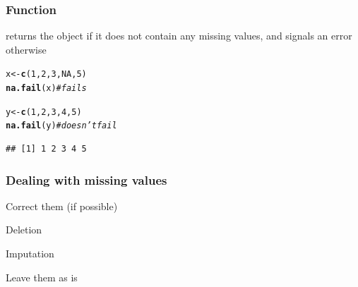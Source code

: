 \documentclass[12pt]{beamer}\usepackage[]{graphicx}\usepackage[]{color}
\makeatletter
\newcommand{\hlnum}[1]{\textcolor[rgb]{0.686,0.059,0.569}{#1}}%
\newcommand{\hlcom}[1]{\textcolor[rgb]{0.678,0.584,0.686}{\textit{#1}}}%
\newcommand{\hlstd}[1]{\textcolor[rgb]{0.345,0.345,0.345}{#1}}%
\newcommand{\hlkwb}[1]{\textcolor[rgb]{0.69,0.353,0.396}{#1}}%
\newcommand{\hlkwd}[1]{\textcolor[rgb]{0.737,0.353,0.396}{\textbf{#1}}}%
\newenvironment{kframe}{%
 \def\at@end@of@kframe{}%
 \ifinner\ifhmode%
  \def\at@end@of@kframe{\end{minipage}}%
  \begin{minipage}{\columnwidth}%
 \fi\fi%
 \def\FrameCommand##1{\hskip\@totalleftmargin \hskip-\fboxsep
 \colorbox{shadecolor}{##1}\hskip-\fboxsep
     \hskip-\linewidth \hskip-\@totalleftmargin \hskip\columnwidth}%
 \MakeFramed {\advance\hsize-\width
   \@totalleftmargin\z@ \linewidth\hsize
   \@setminipage}}%
 {\par\unskip\endMakeFramed%
 \at@end@of@kframe}
\newenvironment{knitrout}{}{} %
\makeatother
\begin{document}

\begin{frame}[fragile]
\frametitle{Function }

{\hilit {}} returns the object if it does not contain any missing values, and signals an error otherwise
\begin{knitrout}\footnotesize
{}\color{fgcolor}\begin{kframe}
\begin{alltt}
\hlstd{x} \hlkwb{<-} \hlkwd{c}\hlstd{(}\hlnum{1}\hlstd{,} \hlnum{2}\hlstd{,} \hlnum{3}\hlstd{,} \hlnum{NA}\hlstd{,} \hlnum{5}\hlstd{)}
\hlkwd{na.fail}\hlstd{(x)}  \hlcom{# fails}
\end{alltt}


{\ttfamily\noindent\bfseries\color{errorcolor}{\#\# Error in na.fail.default(x): missing values in object}}\begin{alltt}
\hlstd{y} \hlkwb{<-} \hlkwd{c}\hlstd{(}\hlnum{1}\hlstd{,} \hlnum{2}\hlstd{,} \hlnum{3}\hlstd{,} \hlnum{4}\hlstd{,} \hlnum{5}\hlstd{)}
\hlkwd{na.fail}\hlstd{(y)}  \hlcom{# doesn't fail}
\end{alltt}
\begin{verbatim}
## [1] 1 2 3 4 5
\end{verbatim}
\end{kframe}
\end{knitrout}

\end{frame}


\begin{frame}
\begin{center}
\Huge{}
\end{center}
\end{frame}


\begin{frame}
\frametitle{Dealing with missing values}

\bbi
  \item Correct them (if possible)
  \item Deletion
  \item Imputation
  \item Leave them as is
\ei
\eb

\end{frame}
\end{document}
